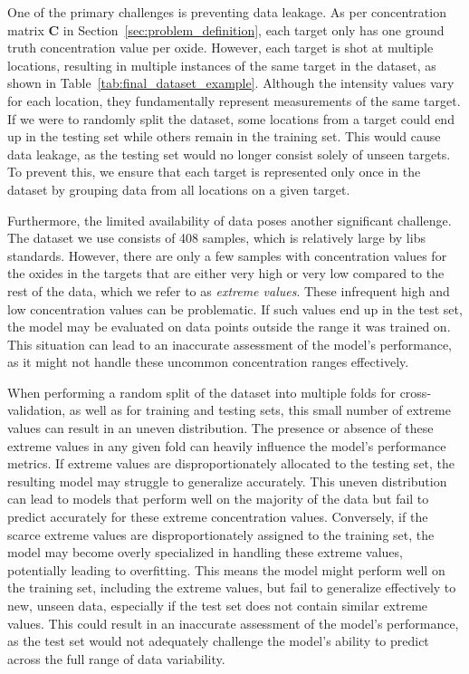 One of the primary challenges is preventing data leakage.
As per concentration matrix $\mathbf{C}$ in Section~\ref{sec:problem_definition}, each target only has one ground truth concentration value per oxide.
However, each target is shot at multiple locations, resulting in multiple instances of the same target in the dataset, as shown in Table~\ref{tab:final_dataset_example}.
Although the intensity values vary for each location, they fundamentally represent measurements of the same target.
If we were to randomly split the dataset, some locations from a target could end up in the testing set while others remain in the training set.
This would cause data leakage, as the testing set would no longer consist solely of unseen targets.
To prevent this, we ensure that each target is represented only once in the dataset by grouping data from all locations on a given target.

Furthermore, the limited availability of data poses another significant challenge.
The dataset we use consists of 408 samples, which is relatively large by \gls{libs} standards.
However, there are only a few samples with concentration values for the oxides in the targets that are either very high or very low compared to the rest of the data, which we refer to as \textit{extreme values}.
These infrequent high and low concentration values can be problematic.
If such values end up in the test set, the model may be evaluated on data points outside the range it was trained on.
This situation can lead to an inaccurate assessment of the model's performance, as it might not handle these uncommon concentration ranges effectively.

When performing a random split of the dataset into multiple folds for cross-validation, as well as for training and testing sets, this small number of extreme values can result in an uneven distribution.
The presence or absence of these extreme values in any given fold can heavily influence the model's performance metrics.
If extreme values are disproportionately allocated to the testing set, the resulting model may struggle to generalize accurately.
This uneven distribution can lead to models that perform well on the majority of the data but fail to predict accurately for these extreme concentration values.
Conversely, if the scarce extreme values are disproportionately assigned to the training set, the model may become overly specialized in handling these extreme values, potentially leading to overfitting.
This means the model might perform well on the training set, including the extreme values, but fail to generalize effectively to new, unseen data, especially if the test set does not contain similar extreme values.
This could result in an inaccurate assessment of the model's performance, as the test set would not adequately challenge the model's ability to predict across the full range of data variability.

